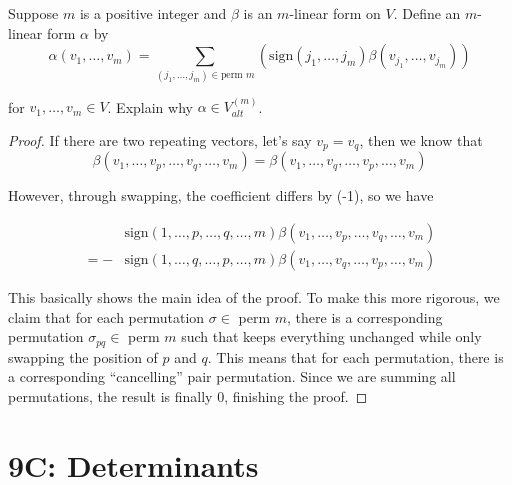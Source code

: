 \documentclass{extarticle}
\begin{document}
\begin{problem}{5}
    Suppose \(m\) is a positive integer and \(\beta\) is an \(m\)-linear form on \(V\). Define an 
    \(m\)-linear form \(\alpha\) by 
    \[\alpha(v_1, \ldots, v_m) = \sum_{(j_1, \ldots, j_m) \in \text{perm } m} 
    \left( \text{sign} \left( j_1, \ldots, j_m \right) \beta(v_{j_1}, \ldots, v_{j_m}) \right)\]

    for \(v_1, \ldots, v_m \in V\). Explain why \(\alpha \in V_{alt}^{(m)}\).
\end{problem}

\begin{proof}
If there are two repeating vectors, let's say \(v_p = v_q\), then we know that 
\[\beta(v_1, \ldots, v_p, \ldots, v_q, \ldots, v_m) = \beta(v_1, \ldots, v_q, \ldots, v_p, \ldots, v_m)\]

However, through swapping, the coefficient differs by (-1), so we have 

\begin{align*}
    &\text{sign}(1, \ldots, p, \ldots, q, \ldots, m) \beta(v_1, \ldots, v_p, \ldots, v_q, \ldots, v_m) \\
= - &\text{sign}(1, \ldots, q, \ldots, p, \ldots, m) \beta(v_1, \ldots, v_q, \ldots, v_p, \ldots, v_m)
\end{align*}


This basically shows the main idea of the proof. To make this more rigorous, we claim that 
for each permutation \(\sigma \in\) perm \(m\), there is a corresponding permutation 
\(\sigma_{pq} \in\) perm \(m\) such that keeps everything unchanged while only swapping the position of 
\(p\) and \(q\). This means that for each permutation, there is a corresponding ``cancelling'' pair 
permutation. Since we are summing all permutations, the result is finally 0, finishing the proof.
\end{proof}







\newpage 
\section*{9C: Determinants}
\end{document}
